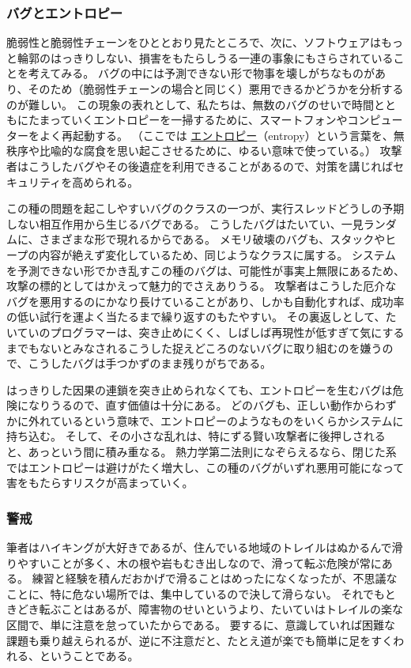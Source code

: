 \documentclass[uplatex]{jsarticle}
\begin{document}
\subsubsection{バグとエントロピー}

脆弱性と脆弱性チェーンをひととおり見たところで、次に、ソフトウェアはもっと輪郭のはっきりしない、損害をもたらしうる一連の事象にもさらされていることを考えてみる。
バグの中には予測できない形で物事を壊しがちなものがあり、そのため（脆弱性チェーンの場合と同じく）悪用できるかどうかを分析するのが難しい。
この現象の表れとして、私たちは、無数のバグのせいで時間とともにたまっていくエントロピーを一掃するために、スマートフォンやコンピューターをよく再起動する。
（ここでは \underline{エントロピー}（entropy）という言葉を、無秩序や比喩的な腐食を思い起こさせるために、ゆるい意味で使っている。）
攻撃者はこうしたバグやその後遺症を利用できることがあるので、対策を講じればセキュリティを高められる。

この種の問題を起こしやすいバグのクラスの一つが、実行スレッドどうしの予期しない相互作用から生じるバグである。
こうしたバグはたいてい、一見ランダムに、さまざまな形で現れるからである。
メモリ破壊のバグも、スタックやヒープの内容が絶えず変化しているため、同じようなクラスに属する。
システムを予測できない形でかき乱すこの種のバグは、可能性が事実上無限にあるため、攻撃の標的としてはかえって魅力的でさえありうる。
攻撃者はこうした厄介なバグを悪用するのにかなり長けていることがあり、しかも自動化すれば、成功率の低い試行を運よく当たるまで繰り返すのもたやすい。
その裏返しとして、たいていのプログラマーは、突き止めにくく、しばしば再現性が低すぎて気にするまでもないとみなされるこうした捉えどころのないバグに取り組むのを嫌うので、こうしたバグは手つかずのまま残りがちである。

はっきりした因果の連鎖を突き止められなくても、エントロピーを生むバグは危険になりうるので、直す価値は十分にある。
どのバグも、正しい動作からわずかに外れているという意味で、エントロピーのようなものをいくらかシステムに持ち込む。
そして、その小さな乱れは、特にずる賢い攻撃者に後押しされると、あっという間に積み重なる。
熱力学第二法則になぞらえるなら、閉じた系ではエントロピーは避けがたく増大し、この種のバグがいずれ悪用可能になって害をもたらすリスクが高まっていく。

\subsubsection{警戒}

筆者はハイキングが大好きであるが、住んでいる地域のトレイルはぬかるんで滑りやすいことが多く、木の根や岩もむき出しなので、滑って転ぶ危険が常にある。
練習と経験を積んだおかげで滑ることはめったになくなったが、不思議なことに、特に危ない場所では、集中しているので決して滑らない。
それでもときどき転ぶことはあるが、障害物のせいというより、たいていはトレイルの楽な区間で、単に注意を怠っていたからである。
要するに、意識していれば困難な課題も乗り越えられるが、逆に不注意だと、たとえ道が楽でも簡単に足をすくわれる、ということである。
\end{document}
